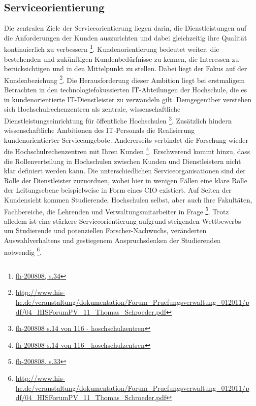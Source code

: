 \documentclass[a4paper, 12pt]{scrreprt}
\begin{document}
\subsection{Serviceorientierung}
Die zentralen Ziele der Serviceorientierung liegen darin, die Dienstleistungen auf die Anforderungen der Kunden auszurichten und dabei gleichzeitig ihre Qualität kontinuierlich zu verbessern \footnote{\url{fh-200808, s.34}}. Kundenorientierung bedeutet weiter, die bestehenden und zukünftigen Kundenbedürfnisse zu kennen, die Interessen zu berücksichtigen und in den Mittelpunkt zu stellen. Dabei liegt der Fokus auf der Kundenbeziehung \footnote{\url{http://www.his-he.de/veranstaltung/dokumentation/Forum_Pruefungsverwaltung_012011/pdf/04_HISForumPV_11_Thomas_Schroeder.pdf}}. Die Herausforderung dieser Ambition liegt bei erstmaligem Betrachten in den technologiefokussierten IT-Abteilungen der Hochschule, die es in kundenorientierte IT-Dienstleister zu verwandeln gilt. Demgegenüber verstehen sich Hochschulrechenzentren als zentrale, wissenschaftliche Dienstleistungseinrichtung für öffentliche Hochschulen \footnote{\url{fh-200808 s.14 von 116 - hoschschulzentren}}. Zusätzlich hindern wissenschaftliche Ambitionen des IT-Personals die Realisierung kundenorientierter Serviceangebote. Andererseits verbindet die Forschung wieder die Hochschulrechenzentren mit Ihren Kunden \footnote{\url{fh-200808 s.14 von 116 - hoschschulzentren}}. Erschwerend kommt hinzu, dass die Rollenverteilung in Hochschulen zwischen Kunden und Dienstleistern nicht klar definiert werden kann. Die unterschiedlichen Serviceorganisationen sind der Rolle der Dienstleister zuzuordnen, wobei hier in wenigen Fällen eine klare Rolle der Leitungsebene beispielweise in Form eines CIO existiert. Auf Seiten der Kundensicht kommen Studierende, Hochschulen selbst, aber auch ihre Fakultäten, Fachbereiche, die Lehrenden und Verwaltungsmitarbeiter in Frage \footnote{\url{fh-200808, s.33}}. Trotz alledem ist eine stärkere Serviceorientierung aufgrund steigenden Wettbewerbs um Studierende und potenziellen Forscher-Nachwuchs, veränderten Auswahlverhaltens und gestiegenem Anspruchsdenken der Studierenden notwendig \footnote{\url{http://www.his-he.de/veranstaltung/dokumentation/Forum_Pruefungsverwaltung_012011/pdf/04_HISForumPV_11_Thomas_Schroeder.pdf}}.
\end{document}
